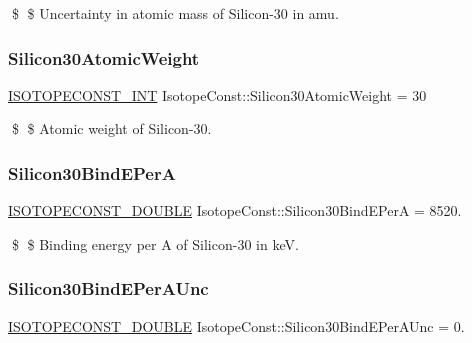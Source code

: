 \$ \$ Uncertainty in atomic mass of Silicon-\/30 in amu. \mbox{\label{group___isotope_const-_silicon-_si30_ga297a58416a4f19cbf7b64a376f206cba}} 
\subsubsection{\texorpdfstring{Silicon30\+Atomic\+Weight}{Silicon30AtomicWeight}}
{\footnotesize\ttfamily \mbox{\hyperlink{group___isotope_const-_macros_ga5f18360b3e99483a35c32d789e62621c}{I\+S\+O\+T\+O\+P\+E\+C\+O\+N\+S\+T\+\_\+\+I\+NT}} Isotope\+Const\+::\+Silicon30\+Atomic\+Weight = 30}

\$ \$ Atomic weight of Silicon-\/30. \mbox{\label{group___isotope_const-_silicon-_si30_ga186966a6c821dd144ef0fa1ae7397bdb}} 
\subsubsection{\texorpdfstring{Silicon30\+Bind\+E\+PerA}{Silicon30BindEPerA}}
{\footnotesize\ttfamily \mbox{\hyperlink{group___isotope_const-_macros_ga8f45a7272ce02c0b4c65c44636ed719a}{I\+S\+O\+T\+O\+P\+E\+C\+O\+N\+S\+T\+\_\+\+D\+O\+U\+B\+LE}} Isotope\+Const\+::\+Silicon30\+Bind\+E\+PerA = 8520.}

\$ \$ Binding energy per A of Silicon-\/30 in keV. \mbox{\label{group___isotope_const-_silicon-_si30_ga3b634297fc1a69e98535b0c099abc6e6}} 
\subsubsection{\texorpdfstring{Silicon30\+Bind\+E\+Per\+A\+Unc}{Silicon30BindEPerAUnc}}
{\footnotesize\ttfamily \mbox{\hyperlink{group___isotope_const-_macros_ga8f45a7272ce02c0b4c65c44636ed719a}{I\+S\+O\+T\+O\+P\+E\+C\+O\+N\+S\+T\+\_\+\+D\+O\+U\+B\+LE}} Isotope\+Const\+::\+Silicon30\+Bind\+E\+Per\+A\+Unc = 0.}

